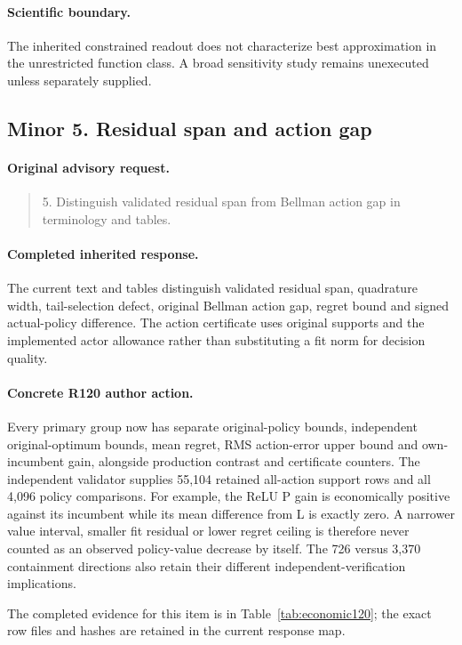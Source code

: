 \paragraph{Scientific boundary.}
The inherited constrained readout does not characterize best approximation in the unrestricted function class. A broad sensitivity study remains unexecuted unless separately supplied.

\subsection{Minor 5. Residual span and action gap}
\label{response120:minor-5}
\paragraph{Original advisory request.}
\begin{quote}
5. Distinguish validated residual span from Bellman action gap in terminology and tables.
\end{quote}
\paragraph{Completed inherited response.}
The current text and tables distinguish validated residual span, quadrature width, tail-selection defect, original Bellman action gap, regret bound and signed actual-policy difference. The action certificate uses original supports and the implemented actor allowance rather than substituting a fit norm for decision quality.
\paragraph{Concrete R120 author action.}
Every primary group now has separate original-policy bounds, independent original-optimum bounds, mean regret, RMS action-error upper bound and own-incumbent gain, alongside production contrast and certificate counters. The independent validator supplies 55,104 retained all-action support rows and all 4,096 policy comparisons. For example, the ReLU P gain is economically positive against its incumbent while its mean difference from L is exactly zero. A narrower value interval, smaller fit residual or lower regret ceiling is therefore never counted as an observed policy-value decrease by itself. The 726 versus 3,370 containment directions also retain their different independent-verification implications.

The completed evidence for this item is in Table~\ref{tab:economic120}; the exact row files and hashes are retained in the current response map.
